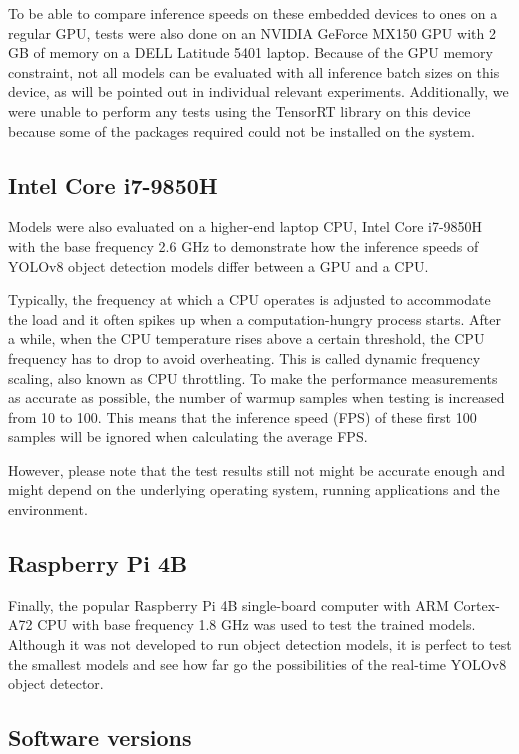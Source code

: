 To be able to compare inference speeds on these embedded devices to ones on a
regular GPU, tests were also done on an NVIDIA GeForce MX150 GPU with 2 GB of
memory on a DELL Latitude 5401 laptop. Because of the GPU memory constraint, not
all models can be evaluated with all inference batch sizes on this device, as
will be pointed out in individual relevant experiments. Additionally, we were
unable to perform any tests using the TensorRT library on this device because
some of the packages required could not be installed on the system.


\subsection{Intel Core i7-9850H}

Models were also evaluated on a higher-end laptop CPU, Intel Core i7-9850H with
the base frequency 2.6 GHz to demonstrate how the inference speeds of YOLOv8
object detection models differ between a GPU and a CPU.

Typically, the frequency at which a CPU operates is adjusted to accommodate the
load and it often spikes up when a computation-hungry process starts. After a
while, when the CPU temperature rises above a certain threshold, the CPU
frequency has to drop to avoid overheating. This is called dynamic frequency
scaling, also known as CPU throttling. To make the performance measurements as
accurate as possible, the number of warmup samples when testing is increased
from 10 to 100. This means that the inference speed (FPS) of these first 100
samples will be ignored when calculating the average FPS.

However, please note that the test results still not might be accurate enough
and might depend on the underlying operating system, running applications and
the environment.


\subsection{Raspberry Pi 4B}

Finally, the popular Raspberry Pi 4B single-board computer with ARM Cortex-A72
CPU with base frequency 1.8 GHz was used to test the trained models. Although it
was not developed to run object detection models, it is perfect to test the
smallest models and see how far go the possibilities of the real-time YOLOv8
object detector.


\subsection{Software versions}

